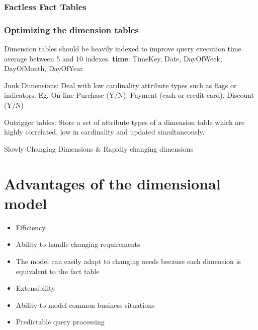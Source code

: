 \documentclass{report}
\begin{document}
\subsubsection{Factless Fact Tables}
\subsubsection{Optimizing the dimension tables}
Dimension tables should be heavily indexed to improve query execution time. average between 5 and 10 indexes. \textbf{time}: TimeKey, Date, DayOfWeek, DayOfMonth, DayOfYear

Junk Dimensions: Deal with low cardinality attribute types such as flags or indicators. Eg. On-line Purchase (Y/N), Payment (cash or credit-card), Discount (Y/N)

Outrigger tables: Store a set of attribute types of a dimension table which are highly correlated, low in cardinality and updated simultaneously.

Slowly Changing Dimensions \& Rapidly changing dimensions

\section{Advantages of the dimensional model}
\begin{itemize}
    \item Efficiency
    \item Ability to handle changing requirements
    \item The model can easily adapt to changing needs because each dimension is equivalent to the fact table
    \item Extensibility
    \item Ability to model common business situations
    \item Predictable query processing
\end{itemize}
\end{document}

